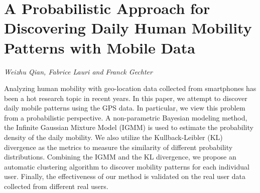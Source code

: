 \documentclass[../booklet.tex]{subfiles}
\begin{document}
\section[A Probabilistic Approach for Discovering Daily Human Mobility Patterns with Mobile Data. {\it Weizhu Qian, Fabrice Lauri and Franck Gechter}]{A Probabilistic Approach for Discovering Daily Human Mobility Patterns with Mobile Data}
  

\begin{center}
  {\it Weizhu Qian, Fabrice Lauri and Franck Gechter}
\end{center}

\vskip 0.8cm


Analyzing human mobility with geo-location data collected from smartphones has been a hot research topic in recent years. In this paper, we attempt to discover daily mobile patterns using the GPS data. In particular, we view this problem from a probabilistic perspective. A non-parametric Bayesian modeling method, the Infinite Gaussian Mixture Model (IGMM) is used to estimate the probability density of the daily mobility. We also utilize the Kullback-Leibler (KL) divergence as the metrics to measure the similarity of different probability distributions. Combining the IGMM and the KL divergence, we propose an automatic clustering algorithm to discover mobility patterns for each individual user. Finally, the effectiveness of our method is validated on the real user data collected from different real users. 

\end{document}
